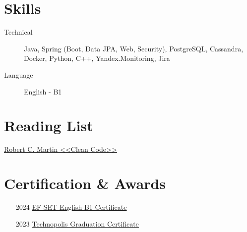 \documentclass[11pt]{article}
\begin{document}
\section{Skills}
\begin{description}
    \item[Technical] Java, Spring (Boot, Data JPA, Web, Security), PostgreSQL, Cassandra, Docker, Python, C++, Yandex.Monitoring, Jira
    \item[Language] English - B1
\end{description}

\section{Reading List}
\begin{description}
    \item \href{https://www.amazon.com/Clean-Code-Handbook-Software-Craftsmanship/dp/0132350882}{\underline{Robert C. Martin <<Clean Code>>}}
\end{description}

\section{Certification \& Awards}
\begin{enumerate}[itemsep=0pt]
    \item [2024] \href{https://disk.yandex.ru/i/_CuHJW-1k6qG8A}{\underline{EF SET English B1 Certificate}}
    \item [2023] \href{https://disk.yandex.ru/i/Ftcyy4kuYyXlEQ}{\underline{Technopolis Graduation Certificate}}
\end{enumerate}
\end{document}
